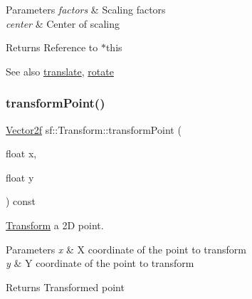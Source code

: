 \begin{DoxyParams}{Parameters}
{\em factors} & Scaling factors \\
\hline
{\em center} & Center of scaling\\
\hline
\end{DoxyParams}
\begin{DoxyReturn}{Returns}
Reference to $\ast$this
\end{DoxyReturn}
\begin{DoxySeeAlso}{See also}
\hyperlink{classsf_1_1_transform_ab54f6c8070cc05e2afcb3145fbf4395a}{translate}, \hyperlink{classsf_1_1_transform_a3e548c3c9e3fb9d4bd43cf852669e555}{rotate} 
\end{DoxySeeAlso}
\mbox{\label{classsf_1_1_transform_af2e38c3c077d28898686662558b41135}} 
\subsubsection{\texorpdfstring{transform\+Point()}{transformPoint()}\hspace{0.1cm}{\footnotesize\ttfamily [1/2]}}
{\footnotesize\ttfamily \hyperlink{classsf_1_1_vector2}{Vector2f} sf\+::\+Transform\+::transform\+Point (\begin{DoxyParamCaption}\item[{float}]{x,  }\item[{float}]{y }\end{DoxyParamCaption}) const}



\hyperlink{classsf_1_1_transform}{Transform} a 2D point. 


\begin{DoxyParams}{Parameters}
{\em x} & X coordinate of the point to transform \\
\hline
{\em y} & Y coordinate of the point to transform\\
\hline
\end{DoxyParams}
\begin{DoxyReturn}{Returns}
Transformed point 
\end{DoxyReturn}
\mbox{\label{classsf_1_1_transform_ab42a0bb7a252c6d221004f6372ce5fdc}} 
